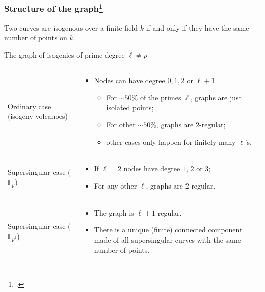 \documentclass{beamer}
\renewcommand{\emph}[1]{{\usebeamercolor[fg]{structure}#1}}
\newcommand{\F}{\mathbb{F}}
\begin{document}
\begin{frame}
  \frametitle{Structure of the graph\footcite{deuring41,kohel,fouquet+morain02,DelfsG16}}
  
  \begin{theorem}
    Two curves are isogenous over a finite field $k$ if and only if
    they have the \alert{same number of points} on $k$.
  \end{theorem}
  \vspace{-0.6em}
  \begin{block}{The graph of isogenies of \alert{prime} degree \alert{$\ell\ne p$}}
    \small
    \vspace{-1em}
    \begin{tabular}{p{} p{}}
      \raggedright
      \emph{Ordinary case (isogeny volcanoes)}
      & \vspace{-1em}
        \begin{itemize}
          \setlength\itemsep{-0.6ex}
        \item Nodes can have degree \emph{$0,1,2$} or \emph{$\ell+1$}.
          \begin{itemize}
          \item  For $\sim 50\%$ of the primes $\ell$, graphs are just isolated
            points;
          \item For other $\sim 50\%$, graphs are $2$-regular;
          \item other cases only happen for finitely many $\ell$'s.
          \end{itemize}
        \end{itemize}
      \\[-1em]
      \raggedright
      \emph{Supersingular case ($\F_p$)}
      & \vspace{-1em}
        \begin{itemize}
          \setlength\itemsep{-0.6ex}
        \item If $\ell=2$ nodes have degree $1$, $2$ or $3$;
        \item For any other $\ell$, graphs are $2$-regular.
        \end{itemize}
      \\[-1em]
      \raggedright
      \emph{Supersingular case ($\F_{p^2}$)}
      & \vspace{-1em}
        \begin{itemize}
          \setlength\itemsep{-0.6ex}
        \item The graph is \emph{$\ell+1$-regular}.
        \item There is a \alert{unique (finite) connected component} made
          of all supersingular curves with the same number of points.
        \end{itemize}
    \end{tabular}
    \vspace{-1.5em}
  \end{block}
\end{frame}
\end{document}
